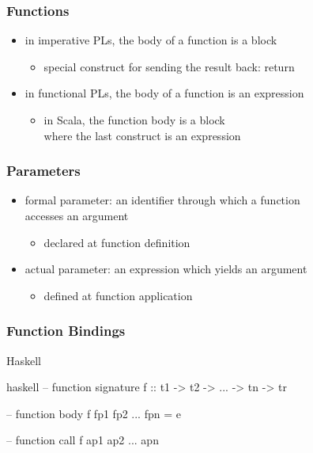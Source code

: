 \documentclass[dvipsnames]{beamer}
\theoremstyle{plain}
\begin{document}
\begin{frame}
  \frametitle{Functions}

  \begin{itemize}
    \item in imperative PLs, the body of a function is a block
    \begin{itemize}
      \item special construct for sending the result back: \alert{return}
    \end{itemize}

    \pause
    \bigskip
    \item in functional PLs, the body of a function is an expression
    \begin{itemize}
      \item in Scala, the function body is a block\\
        where the last construct is an expression
    \end{itemize}
  \end{itemize}
\end{frame}

\begin{frame}
  \frametitle{Parameters}

  \begin{itemize}
    \item \alert{formal parameter}: an identifier through which a function\\
      accesses an argument
    \begin{itemize}
      \item declared at function definition
    \end{itemize}

    \pause
    \medskip
    \item \alert{actual parameter}: an expression which yields an argument
    \begin{itemize}
      \item defined at function application
    \end{itemize}
  \end{itemize}
\end{frame}

\begin{frame}[fragile]
  \frametitle{Function Bindings}

  \begin{block}{Haskell}
    \begin{pygments}{haskell}
-- function signature
f :: t1 -> t2 -> ... -> tn -> tr

-- function body
f fp1 fp2 ... fpn = e

-- function call
f ap1 ap2 ... apn
    \end{pygments}
  \end{block}
\end{frame}
\end{document}
